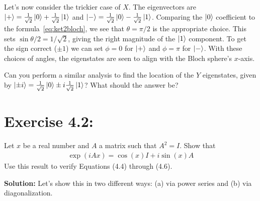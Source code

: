 \documentclass{book}
\begin{document}
    Let's now consider the trickier case of $X$. The eigenvectors are $\ket{+} = \frac{1}{\sqrt{2}}\ket{0} + \frac{1}{\sqrt{2}}\ket{1}$ and $\ket{-} = \frac{1}{\sqrt{2}}\ket{0}-\frac{1}{\sqrt{2}}\ket{1}$. Comparing the $\ket{0}$ coefficient to the formula~\eqref{eq:ket2bloch}, we see that $\theta = \pi/2$ is the appropriate choice. This sets $\sin\theta/2 = 1/\sqrt{2}$, giving the right magnitude of the $\ket{1}$ component. To get the sign correct ($\pm 1$) we can set $\phi = 0$ for $\ket{+}$ and $\phi = \pi$ for $\ket{-}$. With these choices of angles, the eigenstates are seen to align with the Bloch sphere's $x$-axis.
    
    Can you perform a similar analysis to find the location of the $Y$ eigenstates, given by $\ket{\pm i } = \frac{1}{\sqrt{2}}\ket{0}\pm i \frac{1}{\sqrt{2}}\ket{1}$? What should the answer be?
    
\section*{Exercise 4.2:}
    Let $x$ be a real number and $A$ a matrix such that $A^2 = I$. Show that
    \begin{align}
        \exp(iAx) = \cos(x)I + i\sin(x)A
    \end{align}
    Use this result to verify Equations (4.4) through (4.6).
    
    \textbf{Solution:} Let's show this in two different ways: (a) via power series and (b) via diagonalization.
    
\end{document}
